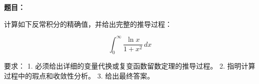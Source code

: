 \textbf{题目：}

计算如下反常积分的精确值，并给出完整的推导过程：

$$ \int_{0}^{\infty} \frac{\ln x}{1 + x^2} \, dx $$

要求：
1. 必须给出详细的变量代换或复变函数留数定理的推导过程。
2. 指明计算过程中的瑕点和收敛性分析。
3. 给出最终答案。
